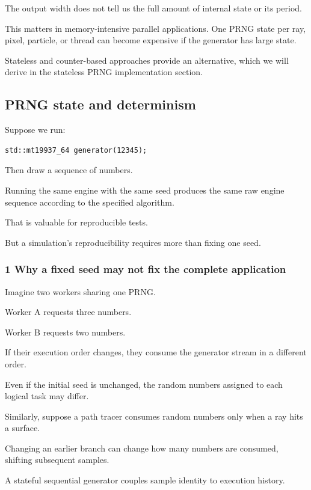 The output width does not tell us the full amount of internal state or its period.

This matters in memory-intensive parallel applications. One PRNG state per ray, pixel, particle, or thread can become expensive if the generator has large state.

Stateless and counter-based approaches provide an alternative, which we will derive in the stateless PRNG implementation section.

\subsection{PRNG state and determinism}\label{02-foundations-ii-ch029-prng-state-and-determinism}

Suppose we run:

\begin{verbatim}
std::mt19937_64 generator(12345);
\end{verbatim}

Then draw a sequence of numbers.

Running the same engine with the same seed produces the same raw engine sequence according to the specified algorithm.

That is valuable for reproducible tests.

But a simulation's reproducibility requires more than fixing one seed.

\subsubsection{1 Why a fixed seed may not fix the complete application}\label{02-foundations-ii-ch029-why-a-fixed-seed-may-not-fix-the-complete-application}

Imagine two workers sharing one PRNG.

Worker A requests three numbers.

Worker B requests two numbers.

If their execution order changes, they consume the generator stream in a different order.

Even if the initial seed is unchanged, the random numbers assigned to each logical task may differ.

Similarly, suppose a path tracer consumes random numbers only when a ray hits a surface.

Changing an earlier branch can change how many numbers are consumed, shifting subsequent samples.

A stateful sequential generator couples sample identity to execution history.

